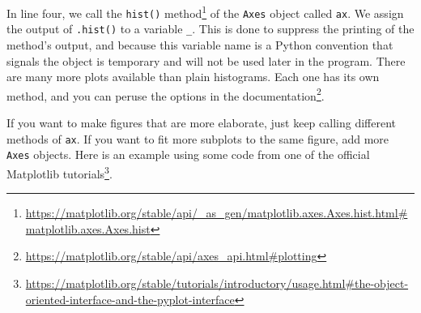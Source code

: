 \documentclass[
  12pt,
  krantz2]{krantz}
\renewcommand{\href}[2]{#2\footnote{\url{#1}}}
\begin{document}
In line four, we call the \href{https://matplotlib.org/stable/api/_as_gen/matplotlib.axes.Axes.hist.html\#matplotlib.axes.Axes.hist}{\texttt{hist()} method} of the \texttt{Axes} object called \texttt{ax}. We assign the output of \texttt{.hist()} to a variable \texttt{\_}. This is done to suppress the printing of the method's output, and because this variable name is a Python convention that signals the object is temporary and will not be used later in the program. There are many more plots available than plain histograms. Each one has its own method, and you can peruse the options in \href{https://matplotlib.org/stable/api/axes_api.html\#plotting}{the documentation}.

If you want to make figures that are more elaborate, just keep calling different methods of \texttt{ax}. If you want to fit more subplots to the same figure, add more \texttt{Axes} objects. Here is an example using some code from \href{https://matplotlib.org/stable/tutorials/introductory/usage.html\#the-object-oriented-interface-and-the-pyplot-interface}{one of the official Matplotlib tutorials}.
\end{document}

